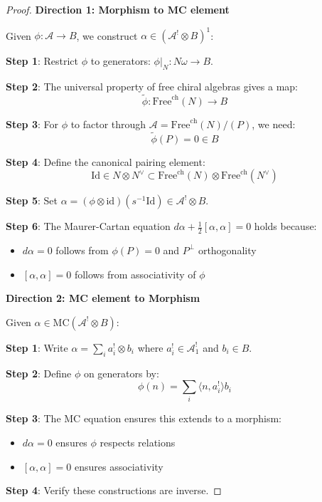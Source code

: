 \begin{proof}
\textbf{Direction 1: Morphism to MC element}

Given $\phi: \mathcal{A} \to B$, we construct $\alpha \in (\mathcal{A}^! \otimes B)^1$:

\textbf{Step 1}: Restrict $\phi$ to generators: $\phi|_N: N\omega \to B$.

\textbf{Step 2}: The universal property of free chiral algebras gives a map:
\[
\tilde{\phi}: \text{Free}^{\text{ch}}(N) \to B
\]

\textbf{Step 3}: For $\phi$ to factor through $\mathcal{A} = \text{Free}^{\text{ch}}(N)/(P)$, we need:
\[
\tilde{\phi}(P) = 0 \in B
\]

\textbf{Step 4}: Define the canonical pairing element:
\[
\text{Id} \in N \otimes N^{\vee} \subset \text{Free}^{\text{ch}}(N) \otimes \text{Free}^{\text{ch}}(N^{\vee})
\]

\textbf{Step 5}: Set $\alpha = (\phi \otimes \text{id})(s^{-1}\text{Id}) \in \mathcal{A}^! \otimes B$.

\textbf{Step 6}: The Maurer-Cartan equation $d\alpha + \frac{1}{2}[\alpha, \alpha] = 0$ holds because:
\begin{itemize}
\item $d\alpha = 0$ follows from $\phi(P) = 0$ and $P^{\perp}$ orthogonality
\item $[\alpha, \alpha] = 0$ follows from associativity of $\phi$
\end{itemize}

\textbf{Direction 2: MC element to Morphism}

Given $\alpha \in \text{MC}(\mathcal{A}^! \otimes B)$:

\textbf{Step 1}: Write $\alpha = \sum_i a_i^! \otimes b_i$ where $a_i^! \in \mathcal{A}^!_1$ and $b_i \in B$.

\textbf{Step 2}: Define $\phi$ on generators by:
\[
\phi(n) = \sum_i \langle n, a_i^! \rangle b_i
\]

\textbf{Step 3}: The MC equation ensures this extends to a morphism:
\begin{itemize}
\item $d\alpha = 0$ ensures $\phi$ respects relations
\item $[\alpha, \alpha] = 0$ ensures associativity
\end{itemize}

\textbf{Step 4}: Verify these constructions are inverse. \qedhere
\end{proof}

